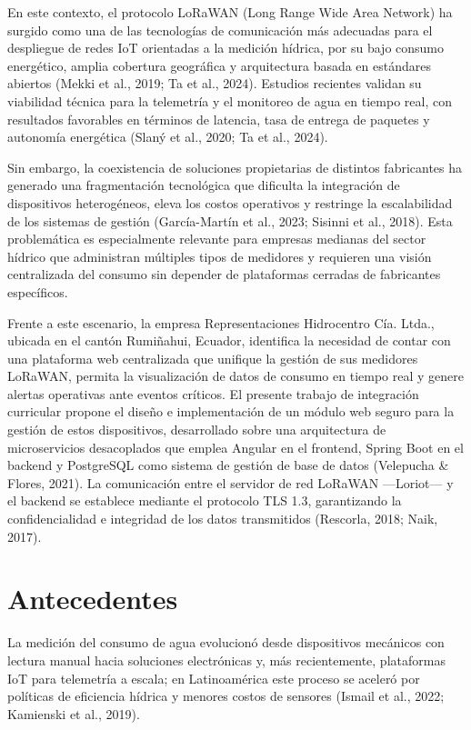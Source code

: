 \documentclass[12pt,a4paper,oneside]{report}
\begin{document}
En este contexto, el protocolo LoRaWAN (Long Range Wide Area Network) ha surgido como una de las tecnologías de comunicación más adecuadas para el despliegue de redes IoT orientadas a la medición hídrica, por su bajo consumo energético, amplia cobertura geográfica y arquitectura basada en estándares abiertos (Mekki et al., 2019; Ta et al., 2024). Estudios recientes validan su viabilidad técnica para la telemetría y el monitoreo de agua en tiempo real, con resultados favorables en términos de latencia, tasa de entrega de paquetes y autonomía energética (Slaný et al., 2020; Ta et al., 2024).

Sin embargo, la coexistencia de soluciones propietarias de distintos fabricantes ha generado una fragmentación tecnológica que dificulta la integración de dispositivos heterogéneos, eleva los costos operativos y restringe la escalabilidad de los sistemas de gestión (García-Martín et al., 2023; Sisinni et al., 2018). Esta problemática es especialmente relevante para empresas medianas del sector hídrico que administran múltiples tipos de medidores y requieren una visión centralizada del consumo sin depender de plataformas cerradas de fabricantes específicos.

Frente a este escenario, la empresa Representaciones Hidrocentro Cía. Ltda., ubicada en el cantón Rumiñahui, Ecuador, identifica la necesidad de contar con una plataforma web centralizada que unifique la gestión de sus medidores LoRaWAN, permita la visualización de datos de consumo en tiempo real y genere alertas operativas ante eventos críticos. El presente trabajo de integración curricular propone el diseño e implementación de un módulo web seguro para la gestión de estos dispositivos, desarrollado sobre una arquitectura de microservicios desacoplados que emplea Angular en el frontend, Spring Boot en el backend y PostgreSQL como sistema de gestión de base de datos (Velepucha \& Flores, 2021). La comunicación entre el servidor de red LoRaWAN ---Loriot--- y el backend se establece mediante el protocolo TLS 1.3, garantizando la confidencialidad e integridad de los datos transmitidos (Rescorla, 2018; Naik, 2017).

\section{Antecedentes}\label{antecedentes}

La medición del consumo de agua evolucionó desde dispositivos mecánicos con lectura manual hacia soluciones electrónicas y, más recientemente, plataformas IoT para telemetría a escala; en Latinoamérica este proceso se aceleró por políticas de eficiencia hídrica y menores costos de sensores (Ismail et al., 2022; Kamienski et al., 2019).
\end{document}
